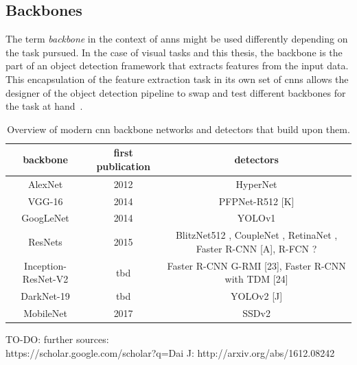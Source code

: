 \documentclass[
			   fontsize=11pt,
               paper=a4,
               bibliography=totoc,
               idxtotoc,
               headsepline,
               footsepline,
               footinclude=false,
               BCOR=12mm,
               DIV=13,
               openany,   %
               ]
               {scrbook}
\begin{document}
\subsection{Backbones} \label{ssec:backbones}

The term \textit{backbone} in the context of \glspl{ann} might be used differently depending on the task pursued. In the case of visual tasks and this thesis, the backbone is the part of an object detection framework that extracts features from the input data. This encapsulation of the feature extraction task in its own set of \glspl{cnn} allows the designer of the object detection pipeline to swap and test different backbones for the task at hand~\cite{backbones}.

\begin{table}[H]
	\begin{tabularx}{\columnwidth}{C | C | C}
		\hline
		backbone					& first publication & detectors \\
		\hline \hline
		AlexNet						  & 2012 \cite{backboneAlexNet}			& HyperNet \cite{detectorHyperNet} \\
		\hline
		VGG-16						 & 2014 \cite{backboneVGG}			   & PFPNet-R512 [K] \\
		\hline
		GoogLeNet			   	   & 2014 \cite{backboneGoogLeNet}			 & YOLOv1 \cite{detectorYOLOv1} \\
		\hline
		ResNets					  	  & 2015 \cite{backboneResNet}		   & BlitzNet512 \cite{detectorBlitzNet}, CoupleNet \cite{detectorCoupleNet}, RetinaNet \cite{detectorRetinaNet},  Faster R-CNN [A], R-FCN ? \\
		\hline
		Inception-ResNet-V2   & tbd					  & Faster R-CNN G-RMI [23], Faster R-CNN with TDM [24] \\
		\hline
		DarkNet-19					& tbd					& YOLOv2 [J] \\
		\hline
		MobileNet					 & 2017 \cite{backboneMobileNet}					 & SSDv2 \\		
	\end{tabularx}
	\caption[Modern CNN Backbones and Detectors]{Overview of modern \gls{cnn} backbone networks and detectors that build upon them.}
	\label{tab:backbonesDetectors}
\end{table}

TO-DO: further sources: \\
 https://scholar.google.com/scholar?q=Dai%
J: http://arxiv.org/abs/1612.08242
\end{document}
